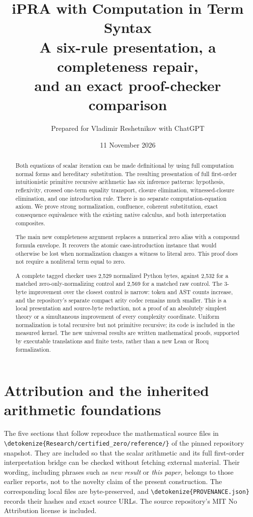 \documentclass[11pt,letterpaper]{article}
\title{\color{ink}\bfseries iPRA with Computation in Term Syntax\\[6pt]
\large A six-rule presentation, a completeness repair,\\
and an exact proof-checker comparison}
\author{Prepared for Vladimir Reshetnikov with ChatGPT}
\date{11 November 2026}
\theoremstyle{definition}
\theoremstyle{remark}
\newcommand{\file}[1]{\expandafter\nolinkurl\expandafter{\detokenize{#1}}}
\begin{document}
\maketitle
\begin{abstract}
Both equations of scalar iteration can be made definitional by using full
computation normal forms and hereditary substitution. The resulting presentation
of full first-order intuitionistic primitive recursive arithmetic has six
inference patterns: hypothesis, reflexivity, crossed one-term equality transport,
closure elimination, witnessed-closure elimination, and one introduction rule.
There is no separate computation-equation axiom. We prove strong normalization,
confluence, coherent substitution, exact consequence equivalence with the
existing native calculus, and both interpretation composites.

The main new completeness argument replaces a numerical zero alias with a
compound formula envelope. It recovers the atomic case-introduction instance
that would otherwise be lost when normalization changes a witness to literal
zero. This proof does not require a nonliteral term equal to zero.

A complete tagged checker uses 2,529 normalized Python bytes, against 2,532
for a matched zero-only-normalizing control and 2,569 for a matched raw control.
The 3-byte improvement over the closest control is narrow: token and AST counts
increase, and the repository's separate compact arity codec remains much smaller.
This is a local presentation and source-byte reduction, not a proof of an
absolutely simplest theory or a simultaneous improvement of every complexity
coordinate. Uniform normalization is total recursive but not primitive
recursive; its code is included in the measured kernel. The new universal
results are written mathematical proofs, supported by executable translations
and finite tests, rather than a new Lean or Rocq formalization.
\end{abstract}
\clearpage
\setcounter{tocdepth}{2}
\tableofcontents
\clearpage







\appendix
\clearpage
\section*{Attribution and the inherited arithmetic foundations}
The five sections that follow reproduce the mathematical source files in
\file{Research/certified_zero/reference/} of the pinned repository snapshot.
They are included so that the scalar arithmetic and its full first-order
interpretation bridge can be checked without fetching external material.
Their wording, including phrases such as \emph{new result} or \emph{this paper},
belongs to those earlier reports, not to the novelty claim of the present
construction. The corresponding local files are byte-preserved, and
\file{PROVENANCE.json} records their hashes and exact source URLs.
The source repository's MIT No Attribution license is included.
\end{document}

